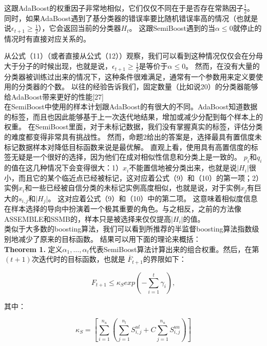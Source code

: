 \documentclass[10pt,journal,compsoc]{IEEEtran}
\begin{document}
这跟AdaBoost的权重因子非常地相似，它们仅仅不同在于是否存在常熟因子$\frac{1}{2}$。
同时，如果AdaBoost遇到了基分类器的错误率要比随机错误率高的情况（也就是说$\epsilon_{t+1}\geq\frac{1}{2}$），它会返回当前的分类器$H_t$。
这跟SemiBoost遇到的当$\alpha\leq0$就停止的情况时有直接对应关系的。

从公式（11）（或者直接从公式（12））观察，我们可以看到这种情况仅仅会在分母大于分子的时候出现，也就是说，$\epsilon_{t+1}\geq\frac{1}{2}$是等价于$\alpha\leq0$。
然而，在没有大量的分类器被训练过出来的情况下，这种条件很难满足，通常有一个参数用来定义要使用的分类器的个数。
以往的经验告诉我们，固定数量（比如说20）的分类器能够给AdaBoost带来更好的性能[27]\\

在SemiBoost中使用的样本计划跟AdaBoost的有很大的不同。AdaBoost知道数据的标签，而且也因此能够基于上一次迭代地结果，增加或减少分配到每个样本上的权重。
在SemiBoost里面，对于未标记数据，我们没有掌握真实的标签，评估分类的难度都变得非常具有挑战性。
然而，命题2给出的答案是，选择最具有置信度未标记数据样本对降低目标函数来说是最优解。
直观上看，使用具有高置信度的标签无疑是一个很好的选择，因为他们在成对相似性信息和分类上是一致的。
$p_i$和$q_i$的值在这几种情况下会变得很大：1）$x_i$不能置信地被分类出来，也就是说$\vert H_i \vert$很小，而且它的某个临近点已经被标记，这对应着公式（9）和（10）的第一项；2）实例$x_i$和一些已经被自信分类的未标记实例高度相似，也就是说，对于实例$x_j$有巨大的$s_{i,j}$和$\vert H_j \vert$。
这对应着公式（9）和（10）中的第二项。
这意味着相似度信息在样本选择的导向中扮演着一个极其重要的角色。与之相反，之前的方法像ASSEMBLE和SSMB的，样本只是被选择来仅仅提高$\vert H_i \vert$的值。\\

类似于大多数的boosting算法，我们可以看到所推荐的半监督boosting算法指数级别地减少了原来的目标函数。
结果可以用下面的理论来概括：\\
\textbf{Theorem 1.}
定义$\alpha_1, \ldots, \alpha_t$代表SemiBoost算法计算出来的组合权重。然后，在第$(t+1)$次迭代时的目标函数，也就是 $\overline{F}_{t+1}$的界限如下：
\begin{center}
\begin{equation*}
F_{t+1}\leq\kappa_S exp(-\sum^t_{i=1}\gamma_i),
\end{equation*}
\end{center}

其中：
\begin{center}
\begin{equation*}
\kappa_S=[\sum^{n_u}_{i=1}(\sum^{n_l}_{j=1}S^{ul}_{i,j}+C\sum^{n_u}_{j=1}S^{uu}_{i,j})]
\end{equation*}
\end{center}
\end{document}
